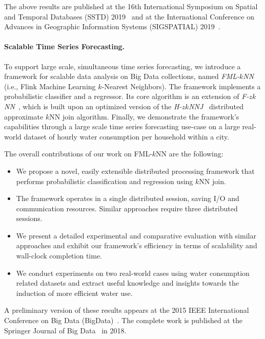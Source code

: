 The above results are published at the 16th International Symposium on Spatial and Temporal Databases (SSTD) 2019~\cite{chatzigeorgakidis2019local} and at the International Conference on Advances in Geographic Information Systems (SIGSPATIAL) 2019~\cite{chatzigeorgakidis2019geolocal}.

\paragraph{Scalable Time Series Forecasting.} To support large scale, simultaneous time series forecasting, we introduce a framework for scalable data analysis on Big Data collections, named \textit{FML-$k$NN} (i.e., Flink Machine Learning $k$-Nearest Neighbors). The framework implements a probabilistic classifier and a regressor. Its core algorithm is an extension of \textit{F-$zk$NN}~\cite{chatzigeorgakidis2015mapreduce}, which is built upon an optimized version of the \textit{H-$zk$NNJ}~\cite{zhang2012epk} distributed approximate $k$NN join algorithm. Finally, we demonstrate the framework's capabilities through a large scale time series forecasting use-case on a large real-world dataset of hourly water consumption per household within a city.

The overall contributions of our work on FML-$k$NN are the following:
\begin{itemize}
	\item We propose a novel, easily extensible distributed processing framework that performs probabilistic classification and regression using $k$NN join.
	\item The framework operates in a single distributed session, saving I/O and communication resources. Similar approaches require three distributed sessions.
	\item We present a detailed experimental and comparative evaluation with similar approaches and exhibit our framework's efficiency in terms of scalability and wall-clock completion time.
	\item We conduct experiments on two real-world cases using water consumption related datasets and extract useful knowledge and insights towards the induction of more efficient water use.
\end{itemize}

A preliminary version of these results appears at the 2015 IEEE International Conference on Big Data (BigData)~\cite{chatzigeorgakidis2015mapreduce}. The complete work is published at the Springer Journal of Big Data~\cite{chatzigeorgakidis2018fml} in 2018.


